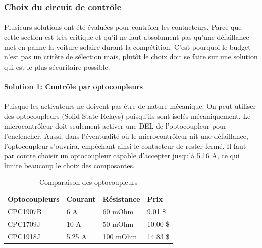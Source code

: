 	\subsubsection*{Choix du circuit de contrôle}
		\paragraph*{}
		Plusieurs solutions ont été évaluées pour contrôler les contacteurs. Parce que cette section est très critique et qu'il ne faut absolument pas qu'une défaillance met en panne la voiture solaire durant la compétition. C'est pourquoi le budget n'est pas un critère de sélection mais, plutôt le choix doit se faire sur une solution qui est le plus sécuritaire possible.

		\paragraph*{Solution 1: Contrôle par optocoupleurs}
		\paragraph*{}			
		Puisque les activateurs ne doivent pas être de nature mécanique. On peut utiliser des optocoupleurs (Solid State Relays) puisqu'ils sont isolés mécaniquement. Le microcontrôleur doit seulement activer une DEL de l'optocoupleur pour l'enclencher. Aussi, dans l'éventualité où le microcontrôleur ait une défaillance, l'optocoupleur s'ouvrira, empêchant ainsi le contacteur de rester fermé. Il faut par contre choisir un optocoupleur capable d'accepter jusqu'à 5.16 A, ce qui limite beaucoup le choix des composantes.
		
		\begin{table}[H]
			\centering
			\caption{Comparaison des optocoupleurs}
			\label{ComparaisonOpto}
			\renewcommand{\arraystretch}{1.3}
			\begin{tabular}{|p{3cm}|p{3cm}|p{3cm}|p{3cm}|}
				\hline
				\textbf{Optocoupleurs} & \textbf{Courant} & \textbf{Résistance} & \textbf{Prix}
				\\ \hhline{|=|=|=|=|}
				CPC1907B & 6 A & 60 mOhm & 9.01 \$ \\ \hline
				CPC1709J & 10 A & 50 mOhm & 10.00 \$ \\ \hline
				CPC1918J & 5.25 A &	100 mOhm & 14.83 \$	\\ \hline
			\end{tabular}
		\end{table}
		
